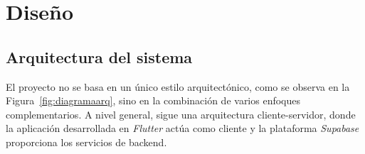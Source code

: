\chapter{Diseño}

\section{Arquitectura del sistema}

El proyecto no se basa en un único estilo arquitectónico, como se observa en la Figura~\ref{fig:diagramaarq}, sino en la combinación de varios enfoques complementarios. A nivel general, sigue una arquitectura cliente-servidor, donde la aplicación desarrollada en \textit{Flutter} actúa como cliente y la plataforma \textit{Supabase} proporciona los servicios de backend. \\

